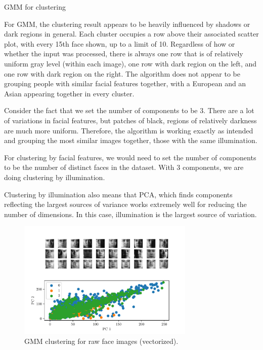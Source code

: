 \documentclass[a4paper]{exam}
\begin{document}
\begin{questions}
    \clearpage\question GMM for clustering

    For GMM, the clustering result appears to be heavily influenced by shadows or dark regions in general.
    Each cluster occupies a row above their associated scatter plot, with every 15th face shown, up to a limit of 10.
    Regardless of how or whether the input was processed, there is always one row that is of relatively uniform gray level (within each image), one row with dark region on the left, and one row with dark region on the right.
    The algorithm does not appear to be grouping people with similar facial features together, with a European and an Asian appearing together in every cluster.

    Consider the fact that we set the number of components to be $3$. There are a lot of variations in facial features, but patches of black, regions of relatively darkness are much more uniform.
    Therefore, the algorithm is working exactly as intended and grouping the most similar images together, those with the same illumination.

    For clustering by facial features, we would need to set the number of components to be the number of distinct faces in the dataset. With $3$ components, we are doing clustering by illumination.

    Clustering by illumination also means that PCA, which finds components reflecting the largest sources of variance works extremely well for reducing the number of dimensions.
    In this case, illumination is the largest source of variation.

    \begin{figure}[h]
        \centering
        \includegraphics[width=0.75\textwidth]{gmm_1024}
        \caption{GMM clustering for raw face images (vectorized).}
        \label{fig:gmm_1024}
    \end{figure}


\end{questions}
\end{document}
